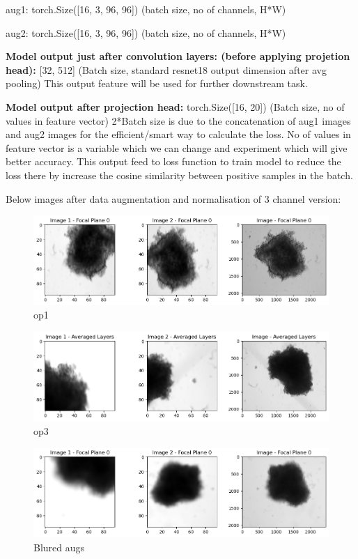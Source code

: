 \documentclass[12pt,twoside,a4paper,parskip]{scrbook} %
\begin{document}
  aug1: torch.Size([16, 3, 96, 96])        (batch size, no of channels, H*W)

  aug2: torch.Size([16, 3, 96, 96])        (batch size, no of channels, H*W)

  \textbf{Model output just after convolution layers: (before applying projetion head):} [32, 512]  (Batch size, standard resnet18 output dimension after avg pooling)   This output feature will be used for further downstream task.

  \textbf{Model output after projection head:} torch.Size([16, 20]) (Batch size, no of values in feature vector) 2*Batch size is due to the concatenation of aug1 images and aug2 images for the efficient/smart way to calculate the loss. No of values in feature vector is a variable which we can change and experiment which will give better accuracy. This output feed to loss function to train model to reduce the loss there by increase the cosine similarity between positive samples in the batch.
   
  Below images after data augmentation and normalisation of 3 channel version:

  \begin{figure}[H]
    \centering
    \includegraphics[width=0.9\linewidth]{figures/op1.png} %
    \caption{op1}
    \label{fig:out_2}
  \end{figure}

  \begin{figure}[H]
    \centering
    \includegraphics[width=0.9\linewidth]{figures/output3.png} %
    \caption{op3}
    \label{fig:output3}
  \end{figure}

  \begin{figure}[H]
    \centering
    \includegraphics[width=0.9\linewidth]{figures/op4.png} %
    \caption{Blured augs}
    \label{fig:output4}
  \end{figure}
\end{document}

